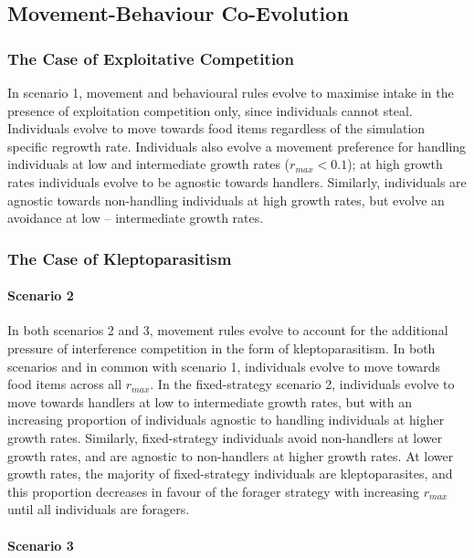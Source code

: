 \documentclass[11pt]{article}
\begin{document}
\subsection{Movement-Behaviour Co-Evolution}

\subsubsection{The Case of Exploitative Competition}

In scenario 1, movement and behavioural rules evolve to maximise intake in the presence of exploitation competition only, since individuals cannot steal.
Individuals evolve to move towards food items regardless of the simulation specific regrowth rate.
Individuals also evolve a movement preference for handling individuals at low and intermediate growth rates ($r_{max} < 0.1$); at high growth rates individuals evolve to be agnostic towards handlers.
Similarly, individuals are agnostic towards non-handling individuals at high growth rates, but evolve an avoidance at low -- intermediate growth rates.

\subsubsection{The Case of Kleptoparasitism}

\paragraph{Scenario 2}

In both scenarios 2 and 3, movement rules evolve to account for the additional pressure of interference competition in the form of kleptoparasitism.
In both scenarios and in common with scenario 1, individuals evolve to move towards food items across all $r_{max}$.
In the fixed-strategy scenario 2, individuals evolve to move towards handlers at low to intermediate growth rates, but with an increasing proportion of individuals agnostic to handling individuals at higher growth rates.
Similarly, fixed-strategy individuals avoid non-handlers at lower growth rates, and are agnostic to non-handlers at higher growth rates.
At lower growth rates, the majority of fixed-strategy individuals are kleptoparasites, and this proportion decreases in favour of the forager strategy with increasing $r_{max}$ until all individuals are foragers.

\paragraph{Scenario 3}
\end{document}
